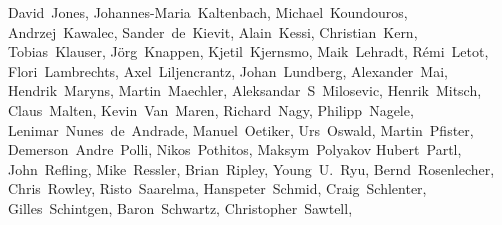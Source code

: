 {David~Jones,               %
Johannes-Maria~Kaltenbach, %
Michael~Koundouros,        %
Andrzej~Kawalec,           %
Sander~de~Kievit,          %
Alain~Kessi,               %
Christian~Kern,            %
Tobias~Klauser,		       %
J\"org~Knappen,            %
Kjetil~Kjernsmo,           %
Maik~Lehradt,              %
R\'emi~Letot,              %
Flori~Lambrechts,          %
Axel~Liljencrantz,	       %
Johan~Lundberg,            %
Alexander~Mai,             %
Hendrik~Maryns,            %
Martin~Maechler,           %
Aleksandar~S~Milosevic,    %
Henrik~Mitsch,             %
Claus~Malten,              %
Kevin~Van~Maren,           %
Richard~Nagy,              %
Philipp~Nagele,            %
Lenimar~Nunes~de~Andrade,  %
Manuel~Oetiker,            %
Urs~Oswald,                %
Martin~Pfister,		       %
Demerson~Andre~Polli,      %
Nikos~Pothitos,		       %
Maksym~Polyakov            %
Hubert~Partl,              %
John~Refling,              %
Mike~Ressler,              %
Brian~Ripley,              %
Young~U.~Ryu,              %
Bernd~Rosenlecher,         %
Chris~Rowley,              %
Risto~Saarelma,            %
Hanspeter~Schmid,          %
Craig~Schlenter,           %
Gilles~Schintgen,          %
Baron~Schwartz,            %
Christopher~Sawtell,       %
}
